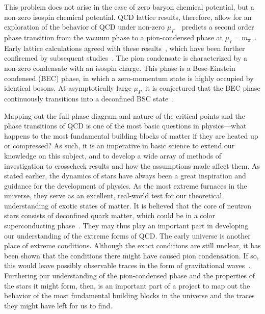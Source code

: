 This problem does not arise in the case of zero baryon chemical potential, but a non-zero isospin chemical potential.
QCD lattice results, therefore, allow for an exploration of the behavior of QCD under non-zero $\mu_I$.
\chpt\, predicts a second order phase transition from the vacuum phase to a pion-condensed phase at $\mu_I = m_\pi$~\autocite{sonQCDFiniteIsospin2001}.
Early lattice calculations agreed with these results~\autocite{kogutQuenchedLatticeQCD2002,kogutLatticeQCDFinite2002,kogutFiniteTemperatureTransition2004,sinclairSearchingElusiveCritical2006}, 
which have been further confiremed by subsequent studies~\autocite{brandtNewClassCompact2018,brandtQCDFiniteIsospin2018,brandtQCDPhaseDiagram2018,brandtReliabilityTaylorExpansions2019,brandtQCDPhaseDiagram2017}.
The pion condensate is characterized by a non-zero condensate with an isospin charge.
This phase is a Bose-Einstein condensed (BEC) phase, in which a zero-momentum state is highly occupied by identical bosons.
At asymptotically large $\mu_I$, it is conjectured that the BEC phase continuously transitions into a deconfined BSC state~\autocite{sonQCDFiniteIsospin2001a,sonQCDFiniteIsospin2001}.




Mapping out the full phase diagram and nature of the critical points and the phase transitions of QCD is one of the most basic questions in physics---what happens to the most fundamental building blocks of matter if they are heated up or compressed?
As such, it is an imperative in basic science to extend our knowledge on this subject, and to develop a wide array of methods of investigation to crosscheck results and how the assumptions made affect them.
As stated earlier, the dynamics of stars have always been a great inspiration and guidance for the development of physics.
As the most extreme furnaces in the universe, they serve as an excellent, real-world test for our theoretical understanding of exotic states of matter.
It is believed that the core of neutron stars consists of deconfined quark matter, which could be in a color superconducting phase~\autocite{baymHadronsQuarksNeutron2018,alfordColorSuperconductivityDense2008}.
They may thus play an important part in developing our understanding of the extreme forms of QCD.
The early universe is another place of extreme conditions.
Although the exact conditions are still unclear, it has been shown that the conditions there might have caused pion condensation.
If so, this would leave possibly observable traces in the form of gravitational waves~\autocite{hajkarimEffectsQCDEquation2019,wygasCosmicQCDEpoch2018,vovchenkoPionCondensationEarly2021}.
Furthering our understanding of the pion-condensed phase and the properties of the stars it might form, then, is an important part of a project to map out the behavior of the most fundamental building blocks in the universe and the traces they might have left for us to find.




